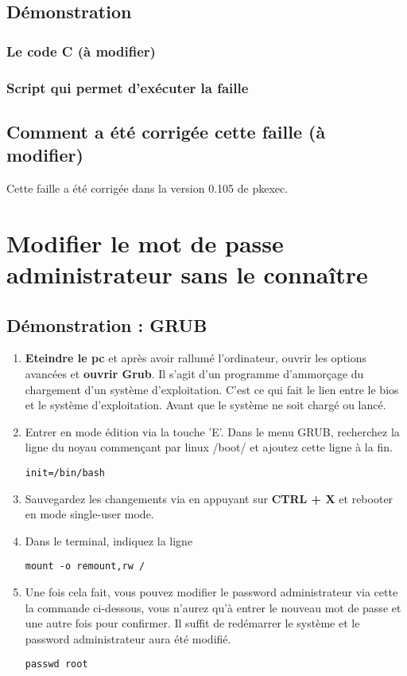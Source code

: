 \documentclass[a4paper, 12pt]{article}
\begin{document}
   		
   		\newpage
   		\subsection{Démonstration}
			\subsubsection{Le code C (à modifier) } 
			  
				
			\subsubsection{Script qui permet d'exécuter la faille}   	
			
		\subsection{Comment a été corrigée cette faille (à modifier)}
		Cette faille a été corrigée dans la version 0.105 de pkexec.

   \section{Modifier le mot de passe administrateur sans le connaître}
        
        \subsection{Démonstration : GRUB}
        \begin{enumerate}
        	\item \textbf{Eteindre le pc} et après avoir rallumé l'ordinateur, ouvrir les options avancées et \textbf{ouvrir Grub}. Il s'agit d'un programme d'ammorçage du chargement d'un système d'exploitation. C'est ce qui fait le lien entre le bios et le système d'exploitation. Avant que le système ne soit chargé ou lancé.
        	\item Entrer en mode édition via la touche 'E'. Dans le menu GRUB, recherchez la ligne du noyau commençant par linux /boot/ et ajoutez cette ligne à la fin.
        	\begin{lstlisting}
init=/bin/bash
        	\end{lstlisting}
        	\item Sauvegardez les changements via en appuyant sur \textbf{CTRL + X} et rebooter en mode single-user mode.
        	\item Dans le terminal, indiquez la ligne
        	\begin{lstlisting}
mount -o remount,rw /
        	\end{lstlisting}
        	\item Une fois cela fait, vous pouvez modifier le password administrateur via cette la commande ci-dessous, vous n'aurez qu'à entrer le nouveau mot de passe et une autre fois pour confirmer. Il suffit de redémarrer le système et le password administrateur aura été modifié. 
        	\begin{lstlisting}
passwd root
        	\end{lstlisting}
        \end{enumerate}
\end{document}
